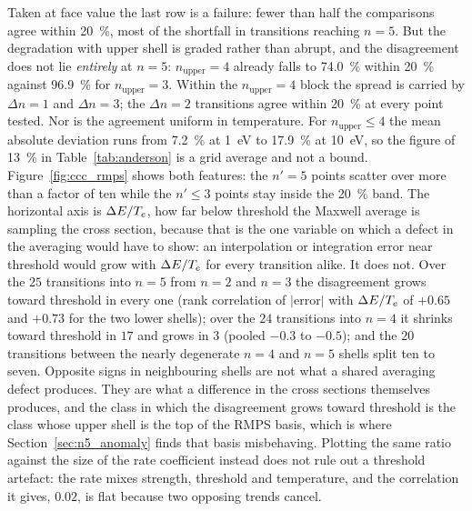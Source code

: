 Taken at face value the last row is a failure: fewer than half the comparisons
agree within \SI{20}{\percent}, most of the shortfall in transitions reaching
$n=5$. But the degradation with upper shell is graded rather than abrupt, and the
disagreement does not lie \emph{entirely} at $n=5$: $n_{\text{upper}} = 4$
already falls to \SI{74.0}{\percent} within \SI{20}{\percent} against
\SI{96.9}{\percent} for $n_{\text{upper}} = 3$. Within the $n_{\text{upper}}=4$
block the spread is carried by $\Delta n = 1$ and $\Delta n = 3$; the $\Delta n =
2$ transitions agree within \SI{20}{\percent} at every point tested. Nor is the
agreement uniform in temperature. For $n_{\text{upper}} \le 4$ the mean absolute
deviation runs from \SI{7.2}{\percent} at \SI{1}{\electronvolt} to
\SI{17.9}{\percent} at \SI{10}{\electronvolt}, so the figure of
\SI{13}{\percent} in Table~\ref{tab:anderson} is a grid average and not a
bound. Figure~\ref{fig:ccc_rmps} shows both features: the $n'=5$ points
scatter over more than a factor of ten while the $n' \le 3$ points stay inside
the \SI{20}{\percent} band. The horizontal axis is $\Delta E/T_e$, how far
below threshold the Maxwell average is sampling the cross section, because
that is the one variable on which a defect in the averaging would have to
show: an interpolation or integration error near threshold would grow with
$\Delta E/T_e$ for every transition alike. It does not. Over the $25$
transitions into $n=5$ from $n=2$ and $n=3$ the disagreement grows toward
threshold in every one (rank correlation of $|$error$|$ with $\Delta E/T_e$
of $+0.65$ and $+0.73$ for the two lower shells); over the $24$ transitions
into $n=4$ it shrinks toward threshold in $17$ and grows in $3$ (pooled $-0.3$
to $-0.5$); and the $20$ transitions between the nearly degenerate $n=4$ and
$n=5$ shells split ten to seven. Opposite signs in neighbouring shells are not
what a shared averaging defect produces. They are what a difference in the
cross sections themselves produces, and the class in which the disagreement
grows toward threshold is the class whose upper shell is the top of the RMPS
basis, which is where Section~\ref{sec:n5_anomaly} finds that basis
misbehaving. Plotting the same ratio against the size of the rate coefficient
instead does not rule out a threshold artefact: the rate mixes strength,
threshold and temperature, and the correlation it gives, $0.02$, is flat
because two opposing trends cancel.

